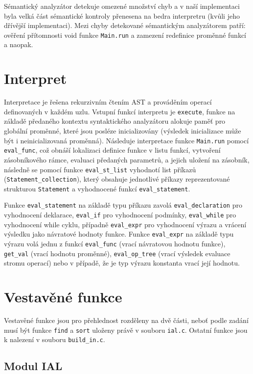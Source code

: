 \documentclass[a4paper,11pt]{article}
\begin{document}
Sémantický analyzátor detekuje omezené množství chyb a v naší implementaci byla velká část sémantické kontroly přenesena na bedra interpretru (kvůli jeho dřívější implementaci). Mezi chyby detekované sémantickým analyzátorem patří: ověření přítomnosti void funkce \texttt{Main.run} a zamezení redefinice proměnné funkcí a naopak.

\section{Interpret}

Interpretace je řešena rekurzivním čtením AST a prováděním operací definovaných v každém uzlu. Vstupní funkcí interpretu je \texttt{execute}, funkce na základě předaného kontextu syntaktického analyzátoru alokuje paměť pro globální proměnné, které jsou posléze inicializovány (výsledek inicializace může být i neinicializovaná proměnná).
Následuje interpretace funkce \texttt{Main.run} pomocí \texttt{eval\_func}, což obnáší lokalizaci definice funkce v listu funkcí, vytvoření zásobníkového rámce, evaluaci předaných parametrů, a jejich uložení na zásobník, následně se pomocí funkce \texttt{eval\_st\_list} vyhodnotí list příkazů (\texttt{Statement\_collection}), který obsahuje jednotlivé příkazy reprezentované strukturou \texttt{Statement} a vyhodnocené funkcí \texttt{eval\_statement}.

Funkce \texttt{eval\_statement} na základě typu příkazu zavolá \texttt{eval\_declaration} pro vyhodnocení deklarace, \texttt{eval\_if} pro vyhodnocení podmínky, \texttt{eval\_while} pro vyhodnocení while cyklu, případně \texttt{eval\_expr} pro vyhodnocení výrazu a vrácení výsledku jako návratové hodnoty funkce.
Funkce \texttt{eval\_expr} na základě typu výrazu volá jednu z funkcí \texttt{eval\_func} (vrací návratovou hodnotu funkce), \texttt{get\_val} (vrací hodnotu proměnné), \texttt{eval\_op\_tree} (vrací výsledek evaluace stromu operací) nebo v případě, že je typ výrazu konstanta vrací její hodnotu.


\section{Vestavěné funkce}
Vestavěné funkce jsou pro přehlednost rozděleny na dvě části, neboť podle zadání musí být funkce \texttt{find} a \texttt{sort} uloženy právě v souboru \texttt{ial.c}. Ostatní funkce jsou k nalezení v souboru \texttt{build\_in.c}.

\subsection {Modul IAL}
\end{document}
